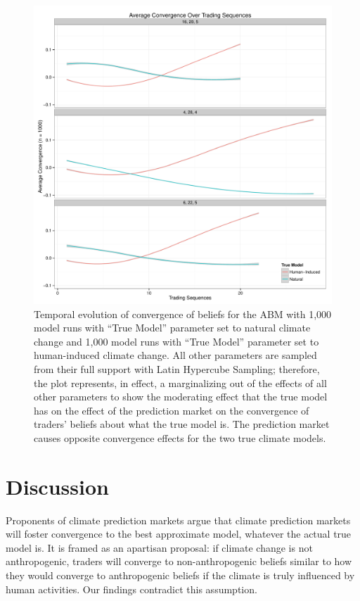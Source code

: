 \documentclass{article}\usepackage[]{graphicx}\usepackage[]{color}
\makeatletter
\def\maxwidth{ %
  \ifdim\Gin@nat@width>\linewidth
    \linewidth
  \else
    \Gin@nat@width
  \fi
}
\newenvironment{knitrout}{}{} %
\makeatother
\begin{document}
\begin{figure}
\centering
\begin{knitrout}
\color{fgcolor}
\includegraphics[width=\maxwidth]{figure/temporal-1} 

\end{knitrout}
\caption{Temporal evolution of convergence of beliefs for the ABM with 1,000 model runs with ``True Model'' parameter set to natural climate change and 1,000 model runs with ``True Model'' parameter set to human-induced climate change. All other parameters are sampled from their full support with Latin Hypercube Sampling; therefore, the plot represents, in effect, a marginalizing out of the effects of all other parameters to show the moderating effect that the true model has on the effect of the prediction market on the convergence of traders' beliefs about what the true model is. The prediction market causes opposite convergence effects for the two true climate models.}
\label{fig:temporal}
\end{figure}

\section*{Discussion}
Proponents of climate prediction markets argue that climate prediction markets will foster convergence to the best approximate model, whatever the actual true model is. It is framed as an apartisan proposal: if climate change is not anthropogenic, traders will converge to non-anthropogenic beliefs similar to how they would converge to anthropogenic beliefs if the climate is truly influenced by human activities. Our findings contradict this assumption. 
\end{document}
